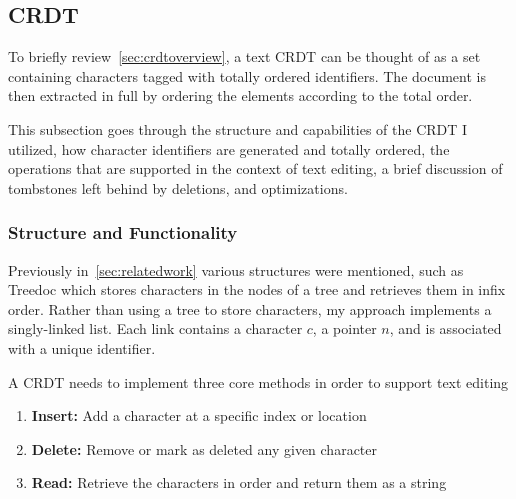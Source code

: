 \documentclass[12pt,a4paper,twoside,openright]{report}
\begin{document}
	
	\subsection{CRDT}
		To briefly review~\cref{sec:crdtoverview}, a text CRDT can be thought of as a set containing characters tagged with totally ordered identifiers. The document is then extracted in full by ordering the elements according to the total order. 
		
		This subsection goes through the structure and capabilities of the CRDT I utilized, how character identifiers are generated and totally ordered, the operations that are supported in the context of text editing, a brief discussion of tombstones left behind by deletions, and optimizations.
		
		\subsubsection{Structure and Functionality} \label{sec:crdtstructure}
		Previously in~\cref{sec:relatedwork} various structures were mentioned, such as Treedoc which stores characters in the nodes of a tree and retrieves them in infix order. Rather than using a tree to store characters, my approach implements a singly-linked list. Each link contains a character $c$, a pointer $n$, and is associated with a unique identifier.
		
		A CRDT needs to implement three core methods in order to support text editing
		\begin{enumerate}
			\item \textbf{Insert:} Add a character at a specific index or location
			\item \textbf{Delete:} Remove or mark as deleted any given character
			\item \textbf{Read:} Retrieve the characters in order and return them as a string
		\end{enumerate} 
		
\end{document}
